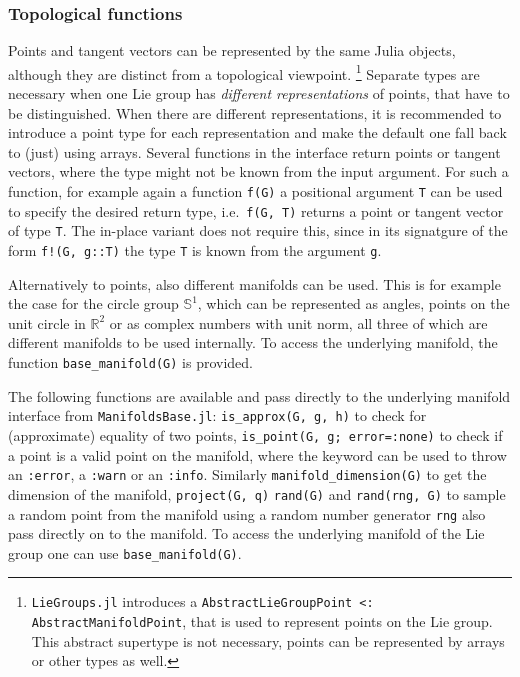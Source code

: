 \documentclass{juliacon}
\begin{document}
\subsubsection*{Topological functions}
Points and tangent vectors can be represented by the same Julia objects, although they are distinct from a topological viewpoint.%
\footnote{\texttt{LieGroups.jl} introduces a \texttt{AbstractLieGroupPoint <: AbstractManifoldPoint}, that is used to represent points on the Lie group.
This abstract supertype is not necessary, points can be represented by arrays or other types as well.}
Separate types are necessary when one Lie group has \emph{different representations} of points, that have to be distinguished. When there are different representations, it is recommended to introduce a point type for each representation and make the default one fall back to (just) using arrays.
Several functions in the interface return points or tangent vectors, where the type might not be known from the input argument. For such a function, for example again a function \verb|f(G)| a positional argument \verb|T| can be used to specify the desired return type, i.e.\ \verb|f(G, T)| returns a point or tangent vector of type \verb|T|.
The in-place variant does not require this, since in its signatgure of the form \verb|f!(G, g::T)| the type \verb|T| is known from the argument \verb|g|.

Alternatively to points, also different manifolds can be used. This is for example the case for the circle group \(\mathbb{S}^1\), which can be represented as angles, points on the unit circle in \(\mathbb{R}^2\) or as complex numbers with unit norm, all three of which are different manifolds to be used internally. To access the underlying manifold, the function \verb|base_manifold(G)| is provided.



The following functions are available and pass directly to the underlying manifold interface from \verb|ManifoldsBase.jl|:
\verb|is_approx(G, g, h)| to check for (approximate) equality of two points,
\verb|is_point(G, g; error=:none)| to check if a point is a valid point on the manifold, where the keyword can be used to throw an \verb|:error|, a \verb|:warn| or an \verb|:info|.
Similarly
\verb|manifold_dimension(G)| to get the dimension of the manifold,
\verb|project(G, q)|%
\verb|rand(G)| and \verb|rand(rng, G)|%
to sample a random point from the manifold using a random number generator \verb|rng| also pass directly on to the manifold.
To access the underlying manifold of the Lie group one can use \verb|base_manifold(G)|.
\end{document}
